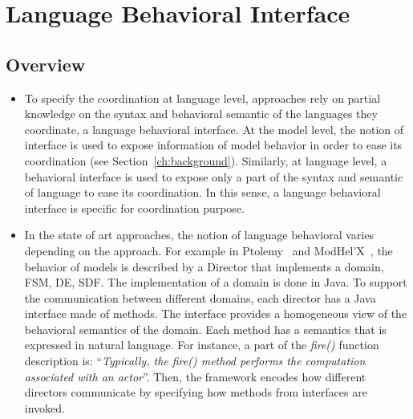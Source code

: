 \section{Language Behavioral Interface}
	\subsection{Overview}
	\begin{itemize}
		\item To specify the coordination at language level, approaches rely on partial knowledge on the syntax and behavioral semantic of the languages they coordinate, \ie a language behavioral interface. At the model level, the notion of interface is used to expose information of model behavior in order to ease its coordination (see Section~\ref{ch:background}). Similarly, at language level, a behavioral interface is used to expose only a part of the syntax and semantic of language to ease its coordination. In this sense, a language behavioral interface is specific for coordination purpose.   
		
		\item In the state of art approaches, the notion of language behavioral varies depending on the approach. For example in Ptolemy~\cite{ptoleframebib} and ModHel'X~\cite{modhelxbib}, the behavior of models is described by a Director that implements a domain, \eg FSM, DE, SDF. The implementation of a domain is done in Java. To support the communication between different domains, each director has a Java interface made of methods. The interface provides a homogeneous view of the behavioral semantics of the domain. Each method has a semantics that is expressed in natural language. For instance, a part of the \emph{fire()} function description is: ``\emph{Typically, the fire() method performs the computation associated with an actor}''. Then, the framework encodes how different directors communicate by specifying how methods from interfaces are invoked. 
		

\end{itemize}
